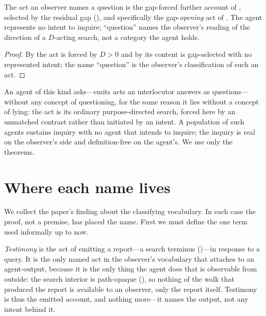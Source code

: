 \documentclass[11pt,twocolumn,a4paper]{article}
\newcommand{\dem}{D}
\begin{document}
\begin{corollary}
\label{cor:question}
The act an observer names a question is the gap-forced further account of
, selected by the residual gap (),
and specifically the gap-\emph{opening} act of . The
agent represents no intent to inquire; ``question'' names the observer's
reading of the direction of a $\dem$-acting search, not a category the agent
holds.
\end{corollary}

\begin{proof}
By  the act is forced by $\dem>0$ and by
 its content is gap-selected with no represented intent;
the name ``question'' is the observer's classification of such an act.
\end{proof}

\begin{remark}
\label{rem:asking}
An agent of this kind asks---emits acts an interlocutor answers as
questions---without any concept of questioning, for the same reason it lies
without a concept of lying: the act is its ordinary purpose-directed search,
forced here by an unmatched contrast rather than initiated by an intent. A
population of such agents sustains inquiry with no agent that intends to
inquire; the inquiry is real on the observer's side and definition-free on
the agent's. We use only the theorems.
\end{remark}

\section{Where each name lives}
\label{sec:vocabulary}

We collect the paper's finding about the classifying vocabulary. In each
case the proof, not a premise, has placed the name. First we must define the
one term used informally up to now.

\begin{definition}[Testimony]
\label{def:testimony}
\emph{Testimony} is the act of emitting a report---a search terminus
()---in response to a query. It is the only named
act in the observer's vocabulary that attaches to an agent-output, because
it is the only thing the agent does that is observable from outside: the
search interior is path-opaque (), so
nothing of the walk that produced the report is available to an observer,
only the report itself. Testimony is thus the emitted account, and nothing
more---it names the output, not any intent behind it.
\end{definition}
\end{document}
